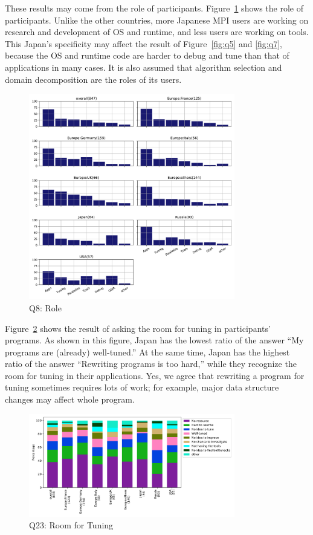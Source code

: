 \documentclass[submit,techrep,noauthor,english]{ipsj}
\begin{document}
These results may come from the role of
participants. Figure~\ref{fig:q8} shows the role of 
participants. Unlike the other countries, more Japanese MPI users are
working on research and development of OS and runtime, and less users
are working on tools. This Japan's specificity may affect the result
of Figure~\ref{fig:q5} and \ref{fig:q7}, because the OS and runtime
code are harder to debug and tune than that of applications in many
cases. It is also assumed that algorithm selection and domain
decomposition are the roles of its users. 

\begin{figure}[htb]
\begin{center}
\includegraphics[width=9cm]{../pdfs/Q8.pdf}
  \vspace{-8mm}
\caption{Q8: Role}
\label{fig:q8}
\end{center}
\end{figure}

Figure~\ref{fig:q23} shows the result of asking the room for tuning in
participants' programs. As shown in this figure, Japan has the
lowest ratio of the answer ``My programs are (already) well-tuned.''
At the same time, Japan has the highest ratio of the answer
``Rewriting programs is too hard,'' while they recognize the room for
tuning in their applications. Yes, we agree that rewriting a program
for tuning sometimes requires lots of work; for example, major data
structure changes may affect whole program.

\begin{figure}[htb]
\begin{center}
\includegraphics[width=9cm]{../pdfs/Q23.pdf}
  \vspace{-8mm}
\caption{Q23: Room for Tuning}
\label{fig:q23}
\end{center}
\end{figure}
\end{document}
